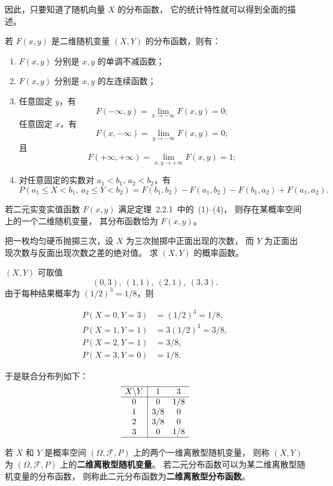 因此，只要知道了随机向量 $X$ 的分布函数，  
它的统计特性就可以得到全面的描述。
\begin{theorem}[二维分布函数的性质]
若 $F(x,y)$ 是二维随机变量 $(X,Y)$ 的分布函数，则有：
\begin{enumerate}[(1)]
\item $F(x,y)$ 分别是 $x,y$ 的单调不减函数；
\item $F(x,y)$ 分别是 $x,y$ 的左连续函数；
\item 任意固定 $y$，有 
\[
F(-\infty,y)=\lim_{x\to -\infty}F(x,y)=0;
\]
任意固定 $x$，有 
\[
F(x,-\infty)=\lim_{y\to -\infty}F(x,y)=0;
\]
且 
\[
F(+\infty,+\infty)=\lim_{x,y\to +\infty}F(x,y)=1;
\]
\item 对任意固定的实数对 $a_1<b_1,\, a_2<b_2$，有
\[
P(a_1\le X<b_1,\ a_2\le Y<b_2)
=F(b_1,b_2)-F(a_1,b_2)-F(b_1,a_2)+F(a_1,a_2).
\]
\end{enumerate}
\end{theorem}
\begin{theorem}\label{thm:2.2.2}
若二元实变实值函数 $F(x,y)$ 满足定理~2.2.1~中的~(1)--(4)，
则存在某概率空间上的一个二维随机变量，
其分布函数恰为 $F(x,y)$。
\end{theorem}
\begin{example}
把一枚均匀硬币抛掷三次，设 $X$ 为三次抛掷中正面出现的次数，
而 $Y$ 为正面出现次数与反面出现次数之差的绝对值。
求 $(X,Y)$ 的概率函数。
\end{example}
\begin{solution}
$(X,Y)$ 可取值
\[
(0,3),\ (1,1),\ (2,1),\ (3,3).
\]
由于每种结果概率为 $(1/2)^3=1/8$，则

\[
\begin{aligned}
P(X=0,Y=3)&=(1/2)^3=1/8,\\
P(X=1,Y=1)&=3(1/2)^3=3/8,\\
P(X=2,Y=1)&=3/8,\\
P(X=3,Y=0)&=1/8.
\end{aligned}
\]

于是联合分布列如下：
\[
\begin{array}{c|cc}
\hline
X \backslash Y & 1 & 3 \\ \hline
0 & 0 & 1/8 \\
1 & 3/8 & 0 \\
2 & 3/8 & 0 \\
3 & 0 & 1/8 \\ \hline
\end{array}
\]

\end{solution}

\begin{definition}\label{def:2.2.3}
若 $X$ 和 $Y$ 是概率空间 $(\Omega, \mathscr{F}, P)$ 上的两个一维离散型随机变量，  
则称 $(X,Y)$ 为 $(\Omega, \mathscr{F}, P)$ 上的\textbf{二维离散型随机变量}。  
若二元分布函数可以为某二维离散型随机变量的分布函数，  
则称此二元分布函数为\textbf{二维离散型分布函数}。
\end{definition}

